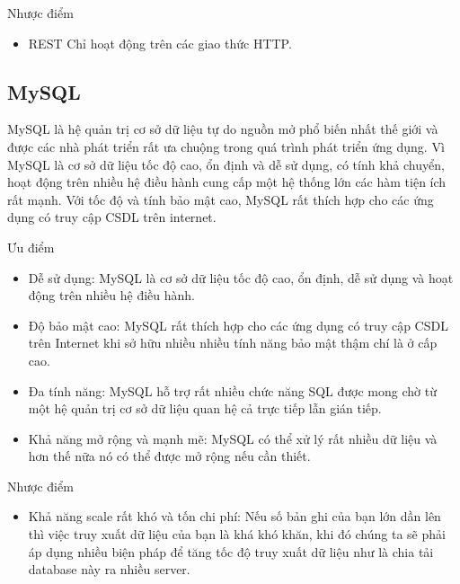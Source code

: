 \begin{itemize}
		    Nhược điểm
		    
	        \begin{itemize}
	            \item REST Chỉ hoạt động trên các giao thức HTTP.
	        \end{itemize}
	 
            \subsection{MySQL}
            
            MySQL là hệ quản trị cơ sở dữ liệu tự do nguồn mở phổ biến nhất thế giới và được các nhà phát triển rất ưa chuộng trong quá trình phát triển ứng dụng. Vì MySQL là cơ sở dữ liệu tốc độ cao, ổn định và dễ sử dụng, có tính khả chuyển, hoạt động trên nhiều hệ điều hành cung cấp một hệ thống lớn các hàm tiện ích rất mạnh. Với tốc độ và tính bảo mật cao, MySQL rất thích hợp cho các ứng dụng có truy cập CSDL trên internet.
            
            Ưu điểm
            
            \begin{itemize}
                \item Dễ sử dụng: MySQL là cơ sở dữ liệu tốc độ cao, ổn định, dễ sử dụng và hoạt động trên nhiều hệ điều hành.
                \item Độ bảo mật cao:  MySQL rất thích hợp cho các ứng dụng có truy cập CSDL trên Internet khi sở hữu nhiều nhiều tính năng bảo mật thậm chí là ở cấp cao.
                \item Đa tính năng: MySQL hỗ trợ rất nhiều chức năng SQL được mong chờ từ một hệ quản trị cơ sở dữ liệu quan hệ cả trực tiếp lẫn gián tiếp.
                \item Khả năng mở rộng và mạnh mẽ: MySQL có thể xử lý rất nhiều dữ liệu và hơn thế nữa nó có thể được mở rộng nếu cần thiết.
            \end{itemize}
            
            Nhược điểm
            
            \begin{itemize}
                \item Khả năng scale rất khó và tốn chi phí: Nếu số bản ghi của bạn lớn dần lên thì việc truy xuất dữ liệu của bạn là khá khó khăn, khi đó chúng ta sẽ phải áp dụng nhiều biện pháp để tăng tốc độ truy xuất dữ liệu như là chia tải database này ra nhiều server.	
            \end{itemize}	

\end{itemize}
